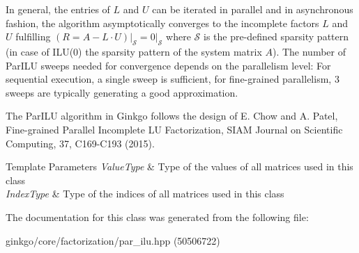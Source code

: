 In general, the entries of $L$ and $U$ can be iterated in parallel and in asynchronous fashion, the algorithm asymptotically converges to the incomplete factors $L$ and $U$ fulfilling $\left(R = A - L \cdot U\right)\vert_\mathcal{S} = 0\vert_\mathcal{S}$ where $\mathcal{S}$ is the pre-\/defined sparsity pattern (in case of I\+L\+U(0) the sparsity pattern of the system matrix $A$). The number of Par\+I\+LU sweeps needed for convergence depends on the parallelism level\+: For sequential execution, a single sweep is sufficient, for fine-\/grained parallelism, 3 sweeps are typically generating a good approximation.

The Par\+I\+LU algorithm in Ginkgo follows the design of E. Chow and A. Patel, Fine-\/grained Parallel Incomplete LU Factorization, S\+I\+AM Journal on Scientific Computing, 37, C169-\/\+C193 (2015).


\begin{DoxyTemplParams}{Template Parameters}
{\em Value\+Type} & Type of the values of all matrices used in this class \\
\hline
{\em Index\+Type} & Type of the indices of all matrices used in this class \\
\hline
\end{DoxyTemplParams}


The documentation for this class was generated from the following file\+:\begin{DoxyCompactItemize}
\item 
ginkgo/core/factorization/par\+\_\+ilu.\+hpp (50506722)\end{DoxyCompactItemize}
